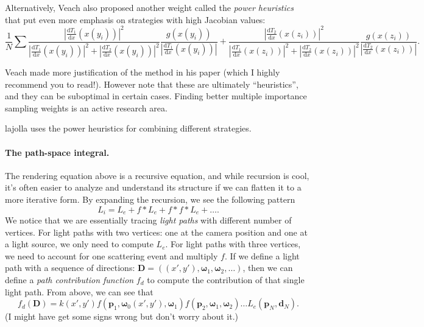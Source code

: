 \documentclass{article}
\begin{document}
Alternatively, Veach also proposed another weight called the \emph{power heuristics} that put even more emphasis on strategies with high Jacobian values:
\begin{equation}
\frac{1}{N} \sum
\frac{|\frac{\mathrm{d}T_1}{\mathrm{d}x}(x(y_i))|^2}{|\frac{\mathrm{d}T_1}{\mathrm{d}x}(x(y_i))|^2 + |\frac{\mathrm{d}T_2}{\mathrm{d}x}(x(y_i))|^2}
\frac{g(x(y_i))}{|\frac{\mathrm{d}T_1}{\mathrm{d}x}(x(y_i))|} + 
\frac{|\frac{\mathrm{d}T_2}{\mathrm{d}x}(x(z_i))|^2}{|\frac{\mathrm{d}T_1}{\mathrm{d}x}(x(z_i))|^2 + |\frac{\mathrm{d}T_2}{\mathrm{d}x}(x(z_i))|^2}
\frac{g(x(z_i))}{|\frac{\mathrm{d}T_2}{\mathrm{d}x}(x(z_i))|}.
\end{equation}

Veach made more justification of the method in his paper (which I highly recommend you to read!). However note that these are ultimately ``heuristics'', and they can be suboptimal in certain cases. Finding better multiple importance sampling weights is an active research area.

lajolla uses the power heuristics for combining different strategies.

\paragraph{The path-space integral.} The rendering equation above is a recursive equation, and while recursion is cool, it's often easier to analyze and understand its structure if we can flatten it to a more iterative form. By expanding the recursion, we see the following pattern
\begin{equation}
    L_i = L_e + f * L_e + f * f * L_e + \dots.
\end{equation}
We notice that we are essentially tracing \emph{light paths} with different number of vertices. For light paths with two vertices: one at the camera position and one at a light source, we only need to compute $L_e$. For light paths with three vertices, we need to account for one scattering event and multiply $f$. If we define a light path with a sequence of directions: $\mathbf{D} = ((x', y'), \mathbf{\omega}_1, \mathbf{\omega}_2, \dots)$, then we can define a \emph{path contribution function} $f_d$ to compute the contribution of that single light path. From above, we can see that
\begin{equation}
    f_d(\mathbf{D}) = k(x', y') f(\mathbf{p}_1, \mathbf{\omega}_0(x', y'), \mathbf{\omega}_1) f(\mathbf{p}_2, \mathbf{\omega}_1, \mathbf{\omega}_2) \dots L_e(\mathbf{p}_N, \mathbf{d}_N).
\end{equation}
(I might have get some signs wrong but don't worry about it.)
\end{document}
